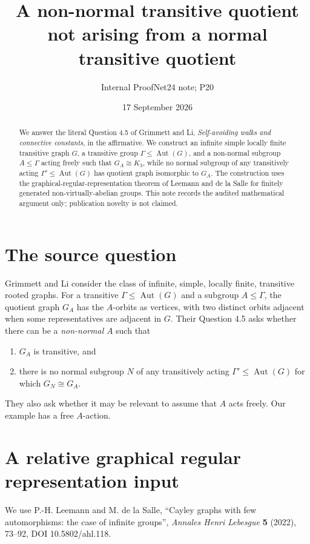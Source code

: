\documentclass[11pt]{article}
\title{A non-normal transitive quotient not arising from a normal transitive quotient}
\author{Internal ProofNet24 note; P20}
\date{17 September 2026}
\newcommand{\Aut}{\operatorname{Aut}}
\begin{document}
\maketitle

\begin{abstract}
We answer the literal Question 4.5 of Grimmett and Li, \emph{Self-avoiding walks and connective constants}, in the affirmative.  We construct an infinite simple locally finite transitive graph $G$, a transitive group $\Gamma\leq\Aut(G)$, and a non-normal subgroup $A\leq\Gamma$ acting freely such that $G_A\cong K_3$, while no normal subgroup of any transitively acting $\Gamma'\leq\Aut(G)$ has quotient graph isomorphic to $G_A$.  The construction uses the graphical-regular-representation theorem of Leemann and de la Salle for finitely generated non-virtually-abelian groups.  This note records the audited mathematical argument only; publication novelty is not claimed.
\end{abstract}

\section{The source question}

Grimmett and Li consider the class of infinite, simple, locally finite, transitive rooted graphs.  For a transitive $\Gamma\leq\Aut(G)$ and a subgroup $A\leq\Gamma$, the quotient graph $G_A$ has the $A$-orbits as vertices, with two distinct orbits adjacent when some representatives are adjacent in $G$.  Their Question 4.5 asks whether there can be a \emph{non-normal} $A$ such that
\begin{enumerate}
\item $G_A$ is transitive, and
\item there is no normal subgroup $N$ of any transitively acting $\Gamma'\leq\Aut(G)$ for which $G_N\cong G_A$.
\end{enumerate}
They also ask whether it may be relevant to assume that $A$ acts freely.  Our example has a free $A$-action.

\section{A relative graphical regular representation input}

We use P.-H. Leemann and M. de la Salle, ``Cayley graphs with few automorphisms: the case of infinite groups'', \emph{Annales Henri Lebesgue} \textbf{5} (2022), 73--92, DOI 10.5802/ahl.118.
\end{document}
